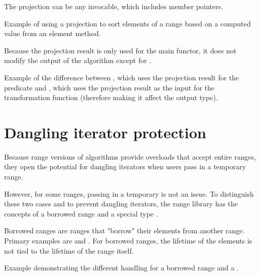 The projection can be any invocable, which includes member pointers.

\begin{codebox}[]{\href{https://compiler-explorer.com/z/4xvjn8jbc}{\ExternalLink}}
\footnotesize Example of using a projection to sort elements of a range based on a computed value from an element method.
\tcblower
{}
\end{codebox}

Because the projection result is only used for the main functor, it does not modify the output of the algorithm except for .

\begin{codebox}[breakable]{\href{https://compiler-explorer.com/z/Tr3zY5YPd}{\ExternalLink}}
\footnotesize Example of the difference between , which uses the projection result for the predicate and , which uses the projection result as the input for the transformation function (therefore making it affect the output type).
\tcblower
{}
\end{codebox}

\section{Dangling iterator protection}

Because range versions of algorithms provide overloads that accept entire ranges, they open the potential for dangling iterators when users pass in a temporary range.

However, for some ranges, passing in a temporary is not an issue. To distinguish these two cases and to prevent dangling iterators, the range library has the concepts of a borrowed range and a special type .

Borrowed ranges are ranges that "borrow" their elements from another range. Primary examples are  and . For borrowed ranges, the lifetime of the elements is not tied to the lifetime of the range itself.

\begin{codebox}[]{\href{https://compiler-explorer.com/z/oY8zYGs7r}{\ExternalLink}}
\footnotesize Example demonstrating the different handling for a borrowed range  and a .
\tcblower
{}
\end{codebox}

